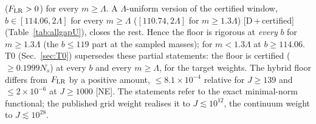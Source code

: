 \documentclass[aps,prl,onecolumn,superscriptaddress,nofootinbib]{revtex4-2}
\begin{document}
($F_{\rm LR}>0$) for every $m\ge\Lambda$. A $\Lambda$-uniform version of the certified window, $b\in[114.06,2\Lambda]$ for every
$m\ge\Lambda$ ($[110.74,2\Lambda]$ for $m\ge1.3\Lambda$) [D\,+\,certified] (Table~\ref{tab:allgapU}), closes the rest. Hence the floor
is rigorous at \emph{every} $b$ for $m\ge1.3\Lambda$ (the $b\le119$ part at the sampled masses); for $m<1.3\Lambda$ at $b\ge114.06$. T0 (Sec.~\ref{sec:T0}) supersedes these
partial statements: the floor is certified ($\ge0.1999N_s$) at every $b$ and every $m\ge\Lambda$, for the target weights.
The hybrid floor differs from $F_{\rm LR}$ by a positive amount, $\le8.1\times10^{-4}$ relative for $J\ge139$ and
$\le2\times10^{-6}$ at $J\ge1000$ [NE]. The statements refer to the exact minimal-norm functional; the published grid
weight realises it to $J\lesssim10^{12}$, the continuum weight to $J\lesssim10^{28}$.
\end{document}
